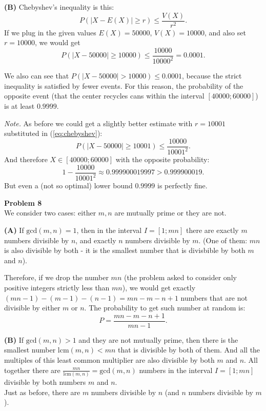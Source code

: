 \documentclass[jou]{apa6}
\begin{document}
\vspace{4pt}
{\bf (B)} Chebyshev's inequality is this:
\begin{equation}
\label{eq:chebyshev}
P(|X-E(X)| \geq r) \leq \frac{V(X)}{r^2}.
\end{equation}
If we plug in the given values $E(X) = 50000$, $V(X) = 10000$, 
and also set $r = 10000$, we would get
$$P(|X - 50000| \geq 10000) \leq \frac{10000}{10000^2} = 0.0001.$$

We also can see that $P(|X - 50000| > 10000) \leq 0.0001$, because
the strict inequality is satisfied by fewer events.
For this reason, the probability of the opposite 
event (that the center recycles
cans within the interval $[40000;60000]$) 
is at least $0.9999$.


{\em Note.} As before we could get a slightly better estimate
with $r = 10001$ substituted in (\ref{eq:chebyshev}): 
$$P(|X - 50000| \geq 10001) \leq \frac{10000}{10001^2}.$$
And therefore $X \in [40000;60000]$ with the opposite probability: 
$$1 - \frac{10000}{10001^2} \approx 0.999900019997 > 0.999900019.$$
But even a (not so optimal) lower bound $0.9999$ is perfectly fine.






\vspace{10pt}
{\bf Problem 8}\\
We consider two cases: either $m,n$ are mutually prime or they are not.

{\bf (A)} If $\text{gcd}(m,n)=1$, then in the interval $I=[1;mn]$ there are 
exactly $m$ numbers divisible by $n$, and exactly $n$ numbers divisible by $m$. 
(One of them: $mn$ is also divisible by both - it is the smallest number that is divisbible by 
both $m$ and $n$). 

Therefore, if we drop the number $mn$ (the problem asked to consider only 
positive integers strictly less than $mn$), we would get exactly $(mn-1)-(m-1)-(n-1)=mn-m-n+1$
numbers that are not divisible by either $m$ or $n$. The probability to get such number
at random is:
$$P = \frac{mn-m-n+1}{mn-1}.$$

{\bf (B)} If $\text{gcd}(m,n)>1$ and they are not mutually prime, then there is 
the smallest number $\text{lcm}(m,n) < mn$ that is divisible by both of them. 
And all the multiples of this least common multiplier are also divisible by both $m$ and $n$. 
All together there are $\frac{mn}{\text{lcm}(m,n)} = \text{gcd}(m,n)$ numbers in 
the interval $I=[1;mn]$ divisible by both numbers $m$ and $n$.\\
Just as before, there are $m$ numbers divisible by $n$ (and $n$ numbers divisible by $m$).
\end{document}
